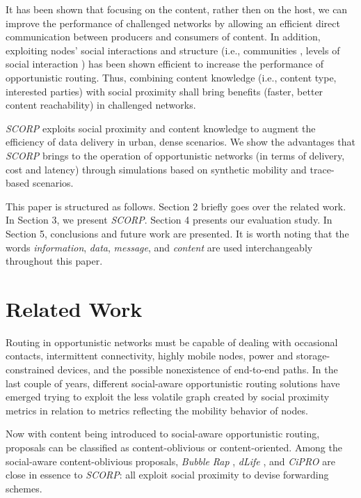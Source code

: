 \documentclass[lnicst]{svmultln}
\begin{document}
It has been shown that focusing on the content, rather then on the
host, we can improve the performance of challenged networks \cite{socialcast,contentplace}
by allowing an efficient direct communication between producers and
consumers of content. In addition, exploiting nodes' social interactions
and structure (i.e., communities \cite{bubble2011}, levels of social
interaction \cite{dlife,cipro}) has been shown efficient to increase
the performance of opportunistic routing. Thus, combining content
knowledge (i.e., content type, interested parties) with social proximity
shall bring benefits (faster, better content reachability) in challenged
networks.

\emph{SCORP} exploits social proximity and content knowledge to augment
the efficiency of data delivery in urban, dense scenarios. We show
the advantages that \emph{SCORP} brings to the operation of opportunistic
networks (in terms of delivery, cost and latency) through simulations
based on synthetic mobility and trace-based scenarios.

This paper is structured as follows. Section 2 briefly goes over the
related work. In Section 3, we present \emph{SCORP}. Section 4 presents
our evaluation study. In Section 5, conclusions and future work are
presented. It is worth noting that the words \emph{information}, \emph{data},
\emph{message}, and \emph{content} are used interchangeably throughout
this paper.


\section{Related Work\label{sec:Related-Work}}

Routing in opportunistic networks must be capable of dealing with
occasional contacts, intermittent connectivity, highly mobile nodes,
power and storage-constrained devices, and the possible nonexistence
of end-to-end paths. In the last couple of years, different social-aware
opportunistic routing solutions have emerged \cite{bookchapter} trying
to exploit the less volatile graph created by social proximity metrics
in relation to metrics reflecting the mobility behavior of nodes.

Now with content being introduced to social-aware opportunistic routing,
proposals can be classified as content-oblivious or content-oriented.
Among the social-aware content-oblivious proposals, \emph{Bubble}
\emph{Rap} \cite{bubble2011}, \emph{dLife} \cite{dlife}, and \emph{CiPRO}
\cite{cipro} are close in essence to \emph{SCORP}: all exploit social
proximity to devise forwarding schemes.
\end{document}
